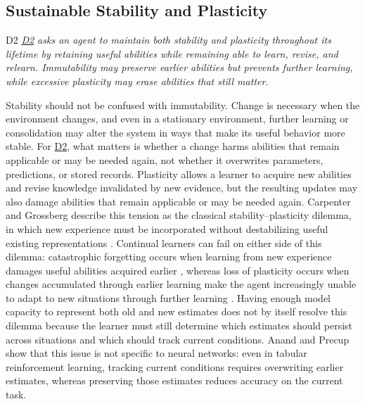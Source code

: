 \documentclass[10pt,journal,compsoc]{IEEEtran}
\DeclareRobustCommand{\Dref}[1]{\hyperref[sec:d#1]{D#1}}
\begin{document}
\subsection{Sustainable Stability and Plasticity}
\label{sec:d2}

\begin{briefbox}[behaviorbrief]{D2}
    \emph{\Dref{2} asks an agent to maintain both stability and plasticity throughout its lifetime by retaining useful abilities while remaining able to learn, revise, and relearn.
    Immutability may preserve earlier abilities but prevents further learning, while excessive plasticity may erase abilities that still matter.}
\end{briefbox}

\noindent Stability should not be confused with immutability.
Change is necessary when the environment changes, and even in a stationary environment, further learning or consolidation may alter the system in ways that make its useful behavior more stable.
For \Dref{2}, what matters is whether a change harms abilities that remain applicable or may be needed again, not whether it overwrites parameters, predictions, or stored records.
Plasticity allows a learner to acquire new abilities and revise knowledge invalidated by new evidence, but the resulting updates may also damage abilities that remain applicable or may be needed again.
Carpenter and Grossberg describe this tension as the classical stability--plasticity dilemma, in which new experience must be incorporated without destabilizing useful existing representations \cite{carpenter1987}.
Continual learners can fail on either side of this dilemma: catastrophic forgetting occurs when learning from new experience damages useful abilities acquired earlier \cite{mccloskey1989,french1999}, whereas loss of plasticity occurs when changes accumulated through earlier learning make the agent increasingly unable to adapt to new situations through further learning \cite{dohare2024}.
Having enough model capacity to represent both old and new estimates does not by itself resolve this dilemma because the learner must still determine which estimates should persist across situations and which should track current conditions.
Anand and Precup \cite{anand2023} show that this issue is not specific to neural networks: even in tabular reinforcement learning, tracking current conditions requires overwriting earlier estimates, whereas preserving those estimates reduces accuracy on the current task.
\end{document}
